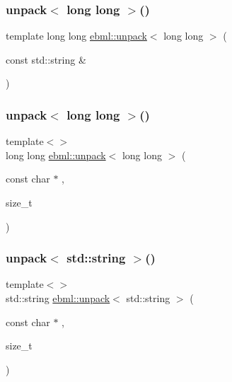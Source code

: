 \mbox{\label{namespaceebml_aee739b2993a6e10f162ee2346d77d17c}} 
\subsubsection{\texorpdfstring{unpack$<$ long long $>$()}{unpack< long long >()}\hspace{0.1cm}{\footnotesize\ttfamily [1/2]}}
{\footnotesize\ttfamily template long long \mbox{\hyperlink{namespaceebml_a55a0f9d0c93e80d488021fd03c4f3861}{ebml\+::unpack}}$<$ long long $>$ (\begin{DoxyParamCaption}\item[{const std\+::string \&}]{ }\end{DoxyParamCaption})}

\mbox{\label{namespaceebml_abb67ef3f7f8a4e21d3aa99d928dd715c}} 
\subsubsection{\texorpdfstring{unpack$<$ long long $>$()}{unpack< long long >()}\hspace{0.1cm}{\footnotesize\ttfamily [2/2]}}
{\footnotesize\ttfamily template$<$$>$ \\
long long \mbox{\hyperlink{namespaceebml_a55a0f9d0c93e80d488021fd03c4f3861}{ebml\+::unpack}}$<$ long long $>$ (\begin{DoxyParamCaption}\item[{const char $\ast$}]{,  }\item[{size\+\_\+t}]{ }\end{DoxyParamCaption})}

\mbox{\label{namespaceebml_ad8250743a22e62d2cdee2b695870398e}} 
\subsubsection{\texorpdfstring{unpack$<$ std\+::string $>$()}{unpack< std::string >()}\hspace{0.1cm}{\footnotesize\ttfamily [1/2]}}
{\footnotesize\ttfamily template$<$$>$ \\
std\+::string \mbox{\hyperlink{namespaceebml_a55a0f9d0c93e80d488021fd03c4f3861}{ebml\+::unpack}}$<$ std\+::string $>$ (\begin{DoxyParamCaption}\item[{const char $\ast$}]{,  }\item[{size\+\_\+t}]{ }\end{DoxyParamCaption})}

